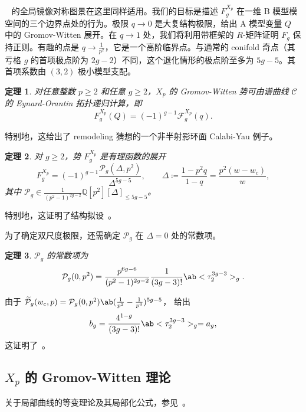 \documentclass{amsart}
\newtheorem{thm}{定理}[section]
\theoremstyle{definition}
\theoremstyle{remark}
\theoremstyle{plain}
\theoremstyle{definition}
\theoremstyle{remark}
\newcommand{\Q}{\mathbb{Q}}
\newcommand{\mc}[1]{\mathcal{#1}}
\newcommand{\wt}[1]{\widetilde{#1}}
\newcommand{\1}{\mathbf{1}}
\newcommand{\2}{\mathbf{2}}
\newcommand{\3}{\mathbf{3}}
\begin{document}
~ 的全局镜像对称图景在这里同样适用。我们的目标是描述 \(F_g^{X_p}\) 在一维 B 模型模空间的三个边界点处的行为。极限 \(q \to 0\) 是大复结构极限，给出 A 模型变量 \(Q\) 中的 Gromov-Witten 展开。在 \(q \to 1\) 处，我们将利用带框架的 \(R\)-矩阵证明 \(F_g\) 保持正则。有趣的点是 \(q \to \frac{1}{p^2}\)，它是一个高阶临界点。与通常的 conifold 奇点（其亏格 \(g\) 的首项极点阶为 \(2g-2\)）不同，这个退化情形的极点阶至多为 \(5g-5\)。其首项系数由 \((3,2)\) 极小模型支配。

\begin{thm}%
\label{thm:local P1 mirror symmetry}
    对任意整数 \(p \geq 2\) 和任意 \(g \geq 2\)，\(X_p\) 的 Gromov-Witten 势可由谱曲线 \(\mc{C}\) 的 Eynard-Orantin 拓扑递归计算，即
    \[ F_g^{X_p}(Q) = (-1)^{g-1}\mc{F}_g^{X_p}(q). \]
\end{thm}

特别地，这给出了 remodeling 猜想的一个非半射影环面 Calabi-Yau 例子。

\begin{thm}%
\label{thm:local P1 rationality}
    对 \(g \geq 2\)，势 \(F_g^{X_p}\) 是有理函数的展开
    \[ F_g^{X_p} = (-1)^{g-1}\frac{\mc{P}_g(\Delta,p^2)}{\Delta^{5g-5}}, \qquad \Delta \coloneqq \frac{1-p^2q}{1-q} = \frac{p^2(w-w_c)}{w}, \]
    其中 \(\mc{P}_g \in \frac{1}{(p^2-1)^{2g-2}}\Q[p^2][\Delta]_{\leq 5g-5}\)。
\end{thm}

特别地，这证明了结构拟设~。

为了确定双尺度极限，还需确定 \(\mc{P}_g\) 在 \(\Delta = 0\) 处的常数项。

\begin{thm}%
\label{thm:local P1 constant term}
    \(\mc{P}_g\) 的常数项为
    \[ \mc{P}_g(0,p^2) = \frac{p^{6g-6}}{(p^2-1)^{2g-2}}\frac{1}{(3g-3)!}\ab<\tau_2^{3g-3}>_g. \]
\end{thm}

由于 \(\wt{\mc{P}}_g(w_c,p) = \mc{P}_g(0,p^2)\ab(\frac{1}{p^2}-\frac{1}{p^4})^{5g-5}\)， 给出
\[ b_g = \frac{4^{1-g}}{(3g-3)!}\ab<\tau_2^{3g-3}>_g = a_g, \]
这证明了~。

\subsection{\(X_p\) 的 Gromov-Witten 理论}%
\label{sub:Gromov-Witten theory of Xp}

关于局部曲线的等变理论及其局部化公式，参见~\cite{BryanPandharipande2008}。
\end{document}
